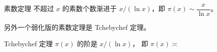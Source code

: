 
\begin{definition}{素数定理}
不超过 $x$ 的素数个数渐进于 $x / (\ln x)$，即 $\pi(x) \sim \dfrac{x}{\ln x}$。
\end{definition}
另外一个弱化版的素数定理是 Tchebychef 定理。
\begin{definition}{Tchebychef 定理}
$\pi(x)$ 的阶是 $x/(\ln x)$， 即 $\pi(x) \asymp$
\end{definition}
